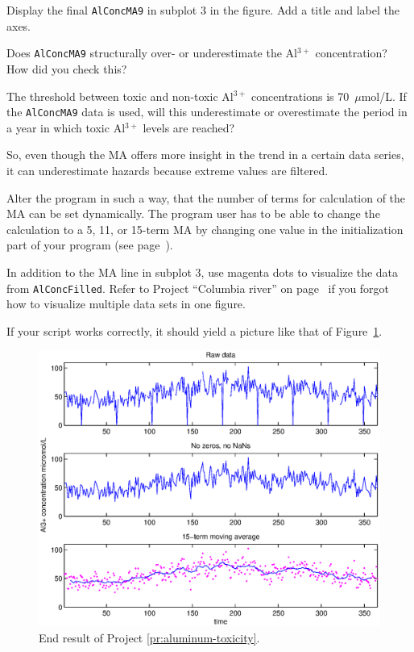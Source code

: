 \begin{action}
Display the final {\tt AlConcMA9} in subplot 3 in the figure. Add a title and label the axes.
\end{action}
\begin{action}
Does {\tt AlConcMA9} structurally over- or underestimate the Al$^{3+}$ concentration? How did you check this?
\end{action}
\begin{action} 
The threshold between toxic and non-toxic Al$^{3+}$ concentrations is 70~$\mu{}$mol/L. If the {\tt AlConcMA9} data is used, will this underestimate or overestimate the period in a year in which toxic Al$^{3+}$ levels are reached?
\end{action}
\noindent So, even though the MA offers more insight in the trend in a certain data series, it can underestimate hazards because extreme values are filtered.
\begin{action}
Alter the program in such a way, that the number of terms for calculation of the MA can be set dynamically. The program user has to be able to change the calculation to a 5, 11, or 15-term MA by changing one value in the initialization part of your program (see page~\pageref{ind:initialization-part}).
\end{action}
\begin{action}
In addition to the MA line in subplot 3, use magenta dots to visualize the data from {\tt AlConcFilled}. Refer to Project ``Columbia river'' on page~\pageref{pr:columbia} if you forgot how to visualize multiple data sets in one figure.
\end{action}
If your script works correctly, it should yield a picture like that of Figure~\ref{fig:aluminum-concentration}.
\begin{figure}[!htb]
  \centering
    \includegraphics[width=1.0\textwidth]{./../eps/aluminum-concentration.eps}
  \caption{End result of Project \ref{pr:aluminum-toxicity}.}\label{fig:aluminum-concentration}
\end{figure}

